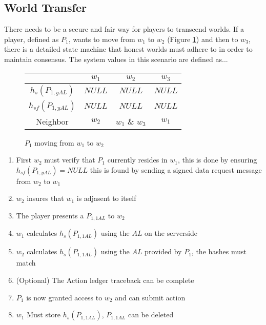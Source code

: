 \documentclass[runningheads,a4paper]{llncs}
\begin{document}
\subsection{World Transfer} 
\label{WT}
There needs to be a secure and fair way for players to transcend worlds. If a player, defined as $P_1$, wants to move from $w_1$ to $w_2$ (Figure \ref{w1tow2}) and then to $w_3$, there is a detailed state machine that honest worlds must adhere to in order to maintain consensus. The system values in this scenario are defined as...

\begin{figure}
\caption{$P_1$ moving from $w_1$ to $w_2$}
\label{w1tow2}
\begin{center}
\end{center}
\begin{center}
\begin{tabular}{ c|c c c }
& $w_1$ & $w_2$ & $w_3$ \\
\hline 
$h_s(P_{1,yAL})$ & $NULL$ & $NULL$ & $NULL$ \\ 
$h_{sf}(P_{1,yAL})$ & $NULL$ & $NULL$ & $NULL$ \\ 
Neighbor & $w_2$ & $w_1$ \& $w_3$ & $w_1$\\
\end{tabular}
\end{center}
\end{figure}

\begin{enumerate}
\item First $w_2$ must verify that $P_1$ currently resides in $w_1$, this is done by ensuring $h_{sf}(P_{1,yAL}) = NULL$ this is found by sending a signed data request message from $w_2$ to $w_1$ 
\item $w_2$ insures that $w_1$ is adjasent to itself
\item The player presents a $P_{1,1AL}$ to $w_2$
\item $w_1$ calculates $h_s(P_{1,1AL})$ using the $AL$ on the serverside
\item $w_2$ calculates $h_s(P_{1,1AL})$ using the $AL$ provided by $P_1$, the hashes must match
\item (Optional) The Action ledger traceback can be complete
\item $P_1$ is now granted access to $w_2$ and can submit action 
\item $w_1$ Must store $h_s(P_{1,1AL})$, $P_{1,1AL}$ can be deleted
\end{enumerate}
\end{document}
